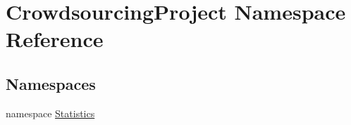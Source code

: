 \hypertarget{namespace_crowdsourcing_project}{}\section{Crowdsourcing\+Project Namespace Reference}
\label{namespace_crowdsourcing_project}
\subsection*{Namespaces}
\begin{DoxyCompactItemize}
\item 
namespace \hyperlink{namespace_crowdsourcing_project_1_1_statistics}{Statistics}
\end{DoxyCompactItemize}
